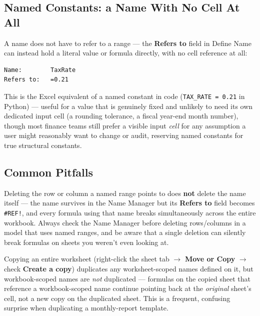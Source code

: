 \documentclass[11pt,a4paper]{article}
\begin{document}
\subsection{Named Constants: a Name With No Cell At All}

A name does not have to refer to a range --- the \textbf{Refers to} field in Define Name can instead hold a literal value or formula directly, with no cell reference at all:

\begin{lstlisting}[style=excelstyle, caption={Define Name dialog: Name = TaxRate, Refers to = 0.21 (no cell involved)}]
Name:        TaxRate
Refers to:   =0.21
\end{lstlisting}

\begin{keyconcept}
This is the Excel equivalent of a named constant in code (\texttt{TAX\_RATE = 0.21} in Python) --- useful for a value that is genuinely fixed and unlikely to need its own dedicated input cell (a rounding tolerance, a fiscal year-end month number), though most finance teams still prefer a visible input \emph{cell} for any assumption a user might reasonably want to change or audit, reserving named constants for true structural constants.
\end{keyconcept}

\subsection{Common Pitfalls}

\begin{pitfall}
Deleting the row or column a named range points to does \textbf{not} delete the name itself --- the name survives in the Name Manager but its \textbf{Refers to} field becomes \texttt{\#REF!}, and every formula using that name breaks simultaneously across the entire workbook. Always check the Name Manager before deleting rows/columns in a model that uses named ranges, and be aware that a single deletion can silently break formulas on sheets you weren't even looking at.
\end{pitfall}

\begin{pitfall}
Copying an entire worksheet (right-click the sheet tab $\rightarrow$ \textbf{Move or Copy} $\rightarrow$ check \textbf{Create a copy}) duplicates any worksheet-scoped names defined on it, but workbook-scoped names are \emph{not} duplicated --- formulas on the copied sheet that reference a workbook-scoped name continue pointing back at the \emph{original} sheet's cell, not a new copy on the duplicated sheet. This is a frequent, confusing surprise when duplicating a monthly-report template.
\end{pitfall}
\end{document}

